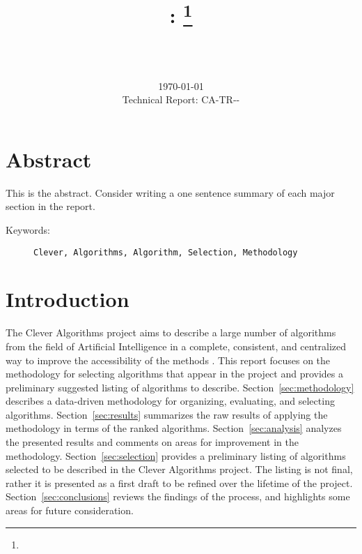 \documentclass[a4paper, 11pt]{article}
\title{{\myreporttitle}: {\myreportsubtitle}\footnote{\myreportlicense}}
\author{\myreportauthor\\{\myreportemail}\\\small\myreportproject}
\date{\today\\{\small{Technical Report: CA-TR-{\myreportdate}-\myreportversion}}}
\begin{document}
\maketitle

\section*{Abstract} 
This is the abstract. Consider writing a one sentence summary of each major section in the report.

\begin{description}
	\item[Keywords:] {\small\texttt{Clever, Algorithms, Algorithm, Selection, Methodology}}
\end{description} 

\section{Introduction}
\label{sec:introduction}
The Clever Algorithms project aims to describe a large number of algorithms from the field of Artificial Intelligence in a complete, consistent, and centralized way to improve the accessibility of the methods \cite{Brownlee2010}. 
This report focuses on the methodology for selecting algorithms that appear in the project and provides a preliminary suggested listing of algorithms to describe. 
Section~\ref{sec:methodology} describes a data-driven methodology for organizing, evaluating, and selecting algorithms. Section~\ref{sec:results} summarizes the raw results of applying the methodology in terms of the ranked algorithms. Section~\ref{sec:analysis} analyzes the presented results and comments on areas for improvement in the methodology. Section~\ref{sec:selection} provides a preliminary listing of algorithms selected to be described in the Clever Algorithms project. The listing is not final, rather it is presented as a first draft to be refined over the lifetime of the project. Section~\ref{sec:conclusions} reviews the findings of the process, and highlights some areas for future consideration.

% 
% 
\end{document}

